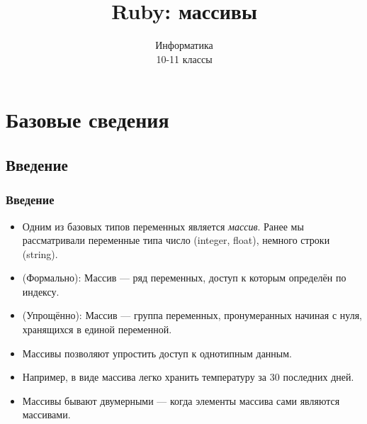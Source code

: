 \documentclass[compress,red]{beamer}
\title{Ruby: массивы}
\author{Информатика \\ 10-11 классы}
\begin{document}
\maketitle

\section{Базовые сведения}

\subsection{Введение}
\begin{frame}
  \frametitle{Введение}
  \begin{itemize}
    \item Одним из базовых типов переменных является \emph{массив}. Ранее мы рассматривали переменные типа число (integer, float), немного строки (string).
    \item (Формально): Массив --- ряд переменных, доступ к которым определён по индексу.
    \item (Упрощённо): Массив --- группа переменных, пронумеранных начиная с нуля, хранящихся в единой переменной.
    \item Массивы позволяют упростить доступ к однотипным данным.
    \item Например, в виде массива легко хранить температуру за 30 последних дней.
    \item Массивы бывают двумерными --- когда элементы массива сами являются массивами.
  \end{itemize}
\end{frame}
\end{document}
